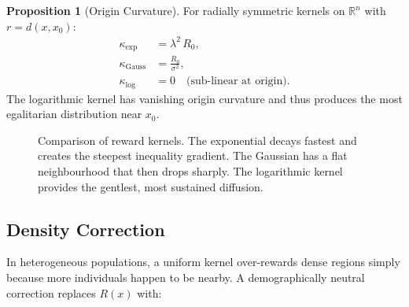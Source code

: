 \documentclass[12pt,a4paper]{article}
\theoremstyle{definition}
\newtheorem{proposition}{Proposition}[section]
\begin{document}
\begin{proposition}[Origin Curvature]
  \label{prop:curvature}
  For radially symmetric kernels on $\mathbb{R}^n$ with $r = d(x, x_0)$:
  \begin{align}
    \kappa_{\exp}   &= \lambda^2\,R_0, \\
    \kappa_{\mathrm{Gauss}} &= \frac{R_0}{\sigma^2}, \\
    \kappa_{\log}   &= 0 \quad \text{(sub-linear at origin).}
  \end{align}
  The logarithmic kernel has vanishing origin curvature and thus produces the
  most egalitarian distribution near $x_0$.
\end{proposition}

\begin{figure}[ht]
\centering
{}
\caption{Comparison of reward kernels.  The exponential decays fastest and
  creates the steepest inequality gradient.  The Gaussian has a flat
  neighbourhood that then drops sharply.  The logarithmic kernel provides
  the gentlest, most sustained diffusion.}
\label{fig:kernels}
\end{figure}

\subsection{Density Correction}

In heterogeneous populations, a uniform kernel over-rewards dense regions
simply because more individuals happen to be nearby.  A demographically neutral
correction replaces $R(x)$ with:
\end{document}
